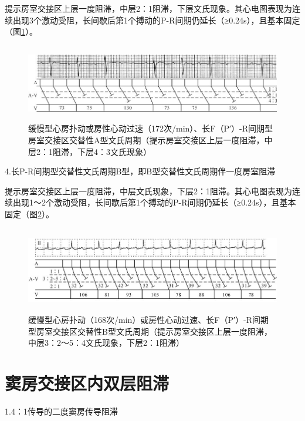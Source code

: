 提示房室交接区上层一度阻滞，中层2：1阻滞，下层文氏现象。其心电图表现为连续出现3个激动受阻，长间歇后第1个搏动的P-R间期仍延长（≥0.24s），且基本固定（图\ref{fig24-11}）。

\begin{figure}[!htbp]
 \centering
 \includegraphics[width=5.80208in,height=1.32292in]{./images/Image00406.jpg}
 \captionsetup{justification=centering}
 \caption{缓慢型心房扑动或房性心动过速（172次/min）、长F（P′）-R间期型房室交接区交替性A型文氏周期（提示房室交接区上层一度阻滞，中层2：1阻滞，下层4：3文氏现象）}
 \label{fig24-11}
  \end{figure} 

4.长P-R间期型交替性文氏周期B型，即B型交替性文氏周期伴一度房室阻滞

提示房室交接区上层一度阻滞，中层文氏现象，下层2：1阻滞。其心电图表现为连续出现1～2个激动受阻，长间歇后第1个搏动的P-R间期仍延长（≥0.24s），且基本固定（图\ref{fig24-12}）。

\begin{figure}[!htbp]
 \centering
 \includegraphics[width=5.79167in,height=1.47917in]{./images/Image00407.jpg}
 \captionsetup{justification=centering}
 \caption{缓慢型心房扑动（168次/min）或房性心动过速、长F（P′）-R间期型房室交接区交替性B型文氏周期（提示房室交接区上层一度阻滞，中层3：2～5：4文氏现象，下层2：1阻滞）}
 \label{fig24-12}
  \end{figure} 

\protect\hypertarget{text00031.htmlux5cux23subid367}{}{}

\section{窦房交接区内双层阻滞}

1.4：1传导的二度窦房传导阻滞

